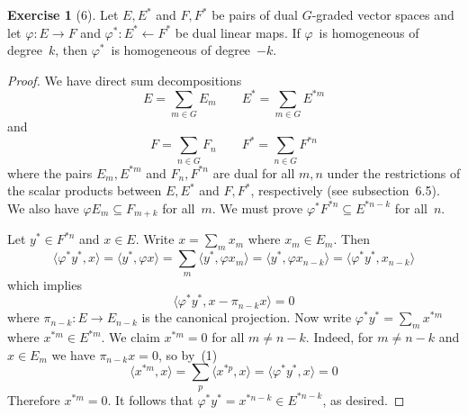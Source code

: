 \documentclass[letterpaper,12pt]{article}
\newcommand{\from}{\leftarrow}
\newcommand{\sprod}[2]{\langle#1,#2\rangle}
\theoremstyle{definition}
\newtheorem*{exer}{Exercise}
\theoremstyle{remark}
\begin{document}
\begin{exer}[6]
Let \(E,E^*\) and \(F,F^*\) be pairs of dual \(G\)-graded vector spaces and let \(\varphi:E\to F\) and \(\varphi^*:E^*\from F^*\) be dual linear maps. If \(\varphi\)~is homogeneous of degree~\(k\), then \(\varphi^*\)~is homogeneous of degree~\(-k\).
\end{exer}
\begin{proof}
We have direct sum decompositions
\[E=\sum_{m\in G}E_m\qquad E^*=\sum_{m\in G}E^{*m}\]
and
\[F=\sum_{n\in G}F_n\qquad F^*=\sum_{n\in G}F^{*n}\]
where the pairs \(E_m,E^{*m}\) and \(F_n,F^{*n}\) are dual for all \(m,n\) under the restrictions of the scalar products between \(E,E^*\) and \(F,F^*\), respectively (see subsection~6.5). We also have \(\varphi E_m\subseteq F_{m+k}\) for all~\(m\). We must prove \(\varphi^* F^{*n}\subseteq E^{*n-k}\) for all~\(n\).

Let \(y^*\in F^{*n}\) and \(x\in E\). Write \(x=\sum_m x_m\) where \(x_m\in E_m\). Then
\[\sprod{\varphi^* y^*}{x}=\sprod{y^*}{\varphi x}=\sum_m\sprod{y^*}{\varphi x_m}=\sprod{y^*}{\varphi x_{n-k}}=\sprod{\varphi^* y^*}{x_{n-k}}\]
which implies
\[\sprod{\varphi^* y^*}{x-\pi_{n-k}x}=0\tag{1}\]
where \(\pi_{n-k}:E\to E_{n-k}\) is the canonical projection. Now write \(\varphi^* y^*=\sum_m x^{*m}\) where \(x^{*m}\in E^{*m}\). We claim \(x^{*m}=0\) for all \(m\ne n-k\). Indeed, for \(m\ne n-k\) and \(x\in E_m\) we have \(\pi_{n-k}x=0\), so by~(1)
\[\sprod{x^{*m}}{x}=\sum_p\sprod{x^{*p}}{x}=\sprod{\varphi^* y^*}{x}=0\]
Therefore \(x^{*m}=0\). It follows that \(\varphi^* y^*=x^{*n-k}\in E^{*n-k}\), as desired.
\end{proof}
\end{document}
